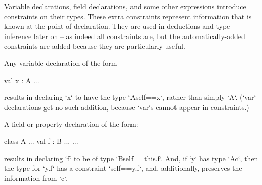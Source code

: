 Variable declarations, field declarations, and some other expressions
introduce constraints on their types.  These extra constraints represent
information that is known at the point of declaration.  They are used in
deductions and type inference later on -- as indeed all constraints are, but
the automatically-added constraints are added because they are particularly
useful.  

Any variable declaration of the form 
\begin{xtenmath}
val x : A ...
\end{xtenmath}
results in declaring \xcd`x` to have the type \xcd`A{self==x}`, rather than
simply \xcd`A`.  (\xcd`var` declarations get no such addition, because
\xcd`var`s cannot appear in constraints.)

A field or property declaration of the form: 
\begin{xtenmath}
class A {
   ... 
   val f : B ...
   ...
}
\end{xtenmath}
results in declaring \xcd`f` to be of type \xcd`B{self==this.f}`.
And, if \xcd`y` has type \xcd`A{c}`, then the type 
for \xcd`y.f` has a constraint \xcd`self==y.f`, and, additionally, 
preserves the information from \xcd`c`.  


